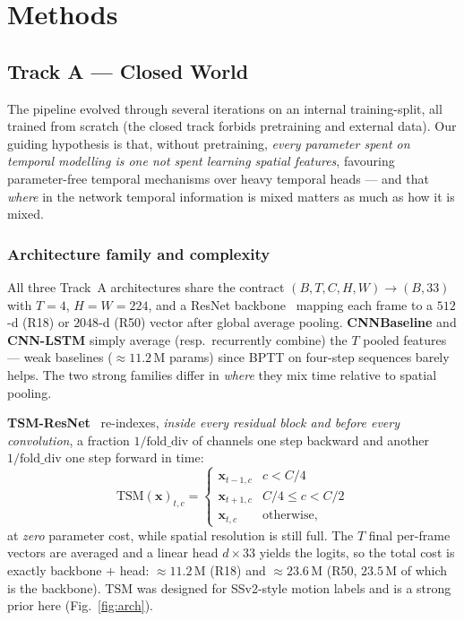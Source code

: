 \documentclass[10pt,twocolumn,letterpaper]{article}
\begin{document}
\section{Methods}
\label{sec:method}

\subsection{Track A --- Closed World}
\label{sec:trackA}
The pipeline evolved through several iterations on an internal training-split,
all trained from scratch (the closed track forbids pretraining and external
data). Our guiding hypothesis is that, without pretraining, \emph{every
parameter spent on temporal modelling is one not spent learning spatial
features}, favouring parameter-free temporal mechanisms over heavy temporal
heads --- and that \emph{where} in the network temporal information is mixed
matters as much as how it is mixed.

\subsubsection{Architecture family and complexity}
\label{sec:arch}
All three Track~A architectures share the contract $(B, T, C, H, W) \to
(B, 33)$ with $T{=}4$, $H{=}W{=}224$, and a ResNet
backbone~\cite{he2016resnet} mapping each frame to a $512$-d (R18) or
$2048$-d (R50) vector after global average pooling. \textbf{CNNBaseline} and
\textbf{CNN-LSTM} simply average (resp.\ recurrently combine) the $T$ pooled
features --- weak baselines ($\approx\!11.2$\,M params) since BPTT on
four-step sequences barely helps. The two strong families differ in
\emph{where} they mix time relative to spatial pooling.

\noindent\textbf{TSM-ResNet}~\cite{lin2019tsm} re-indexes, \emph{inside every
residual block and before every convolution}, a fraction
$1/\text{fold\_div}$ of channels one step backward and another
$1/\text{fold\_div}$ one step forward in time:
\begin{equation}
  \text{TSM}(\mathbf{x})_{t,c} = \begin{cases}
  \mathbf{x}_{t-1,c} & c < C/4 \\
  \mathbf{x}_{t+1,c} & C/4 \leq c < C/2 \\
  \mathbf{x}_{t,c}   & \text{otherwise,}
  \end{cases}
  \label{eq:tsm}
\end{equation}
at \emph{zero} parameter cost, while spatial resolution is still full. The $T$
final per-frame vectors are averaged and a linear head $d\!\times\!33$ yields
the logits, so the total cost is exactly backbone $+$ head:
$\approx\!11.2$\,M (R18) and $\approx\!23.6$\,M (R50, $23.5$\,M of which is the
backbone). TSM was designed for SSv2-style motion labels and is a strong prior
here (Fig.~\ref{fig:arch}).
\end{document}
